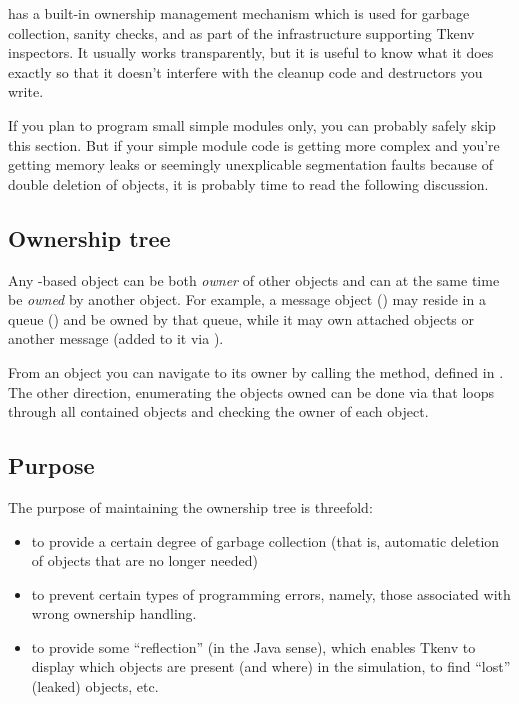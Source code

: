 {\opp} has a built-in ownership management mechanism which
is used for garbage collection, sanity checks, and as
part of the infrastructure supporting Tkenv inspectors.
It usually works transparently, but it is useful to know
what it does exactly so that it doesn't interfere
with the cleanup code and destructors you write.

If you plan to program small simple modules only, you can probably
safely skip this section. But if your simple module code
is getting more complex and you're getting memory leaks or seemingly
unexplicable segmentation faults because of double deletion of objects,
it is probably time to read the following discussion.


\subsection{Ownership tree}

Any -based object can be both \textit{owner} of other
objects and can at the same time be \textit{owned} by another object.
For example, a message object () may reside
in a queue () and be owned by that queue, while it
may own attached  objects or another message
(added to it via ).

From an object you can navigate to its owner by calling the 
method, defined in . The other direction, enumerating the
objects owned can be done via  that loops through all
contained objects and checking the owner of each object.


\subsection{Purpose}

The purpose of maintaining the ownership tree is threefold:

\begin{itemize}
    \item{to provide a certain degree of garbage collection (that is,
    automatic deletion of objects that are no longer needed)}

    \item{to prevent certain types of programming errors, namely,
    those associated with wrong ownership handling.}

    \item{to provide some ``reflection'' (in the Java sense), which
    enables Tkenv to display which objects are present (and where)
    in the simulation, to find ``lost'' (leaked) objects, etc.}
\end{itemize}

